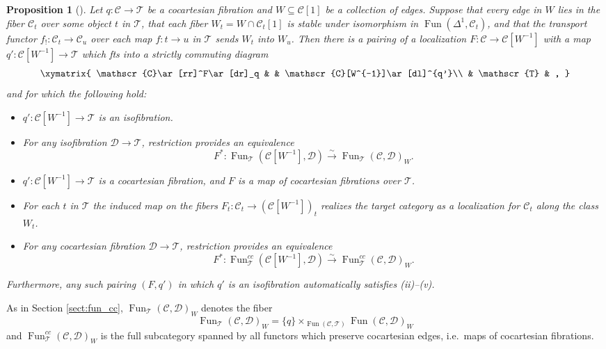 \documentclass[reqno]{amsart}
\newtheorem{proposition}[lemma]{Proposition}
\theoremstyle{definition}
\newcommand{\msc}[1]{\mathscr{#1}}
\DeclareMathOperator{\Fun}{Fun}
\renewcommand{\1}{\mathbf{1}}
\begin{document}
\begin{proposition}[{\cite[Proposition 2.1.4]{hinich16}}]\label{prop:fib_localize}
Let $q:\msc{C}\to \msc{T}$ be a cocartesian fibration and $W\subseteq \msc{C}[1]$ be a collection of edges.  Suppose that every edge in $W$ lies in the fiber $\msc{C}_t$ over some object $t$ in $\msc{T}$, that each fiber $W_t=W\cap \msc{C}_t[1]$ is stable under isomorphism in $\Fun(\Delta^1,\msc{C}_t)$, and that the transport functor $f_!:\msc{C}_t\to \msc{C}_{u}$ over each map $f:t\to u$ in $\msc{T}$ sends $W_t$ into $W_u$.  Then there is a pairing of a localization $F:\msc{C}\to \msc{C}[W^{-1}]$ with a map $q':\msc{C}[W^{-1}]\to \msc{T}$ which fts into a strictly commuting diagram
\begin{equation}\label{eq:3037}
\xymatrix{
\msc{C}\ar[rr]^F\ar[dr]_q & & \msc{C}[W^{-1}]\ar[dl]^{q'}\\
	& \msc{T} & ,
}
\end{equation}
and for which the following hold:
\begin{itemize}
\item[(i)] $q':\msc{C}[W^{-1}]\to \msc{T}$ is an isofibration.\vspace{1mm}
\item[(ii)] For any isofibration $\msc{D}\to\msc{T}$, restriction provides an equivalence
\[
F^{\ast}:\Fun_{\msc{T}}(\msc{C}[W^{-1}],\msc{D})\overset{\sim}\to \Fun_{\msc{T}}(\msc{C},\msc{D})_W.
\]
\item[(iii)] $q':\msc{C}[W^{-1}]\to \msc{T}$ is a cocartesian fibration, and $F$ is a map of cocartesian fibrations over $\msc{T}$.\vspace{1mm}
\item[(iv)] For each $t$ in $\msc{T}$ the induced map on the fibers $F_t:\msc{C}_t\to (\msc{C}[W^{-1}])_t$ realizes the target category as a localization for $\msc{C}_t$ along the class $W_t$.\vspace{1mm}
\item[(v)] For any cocartesian fibration $\msc{D}\to \msc{T}$, restriction provides an equivalence
\[
F^{\ast}:\Fun_{\msc{T}}^{cc}(\msc{C}[W^{-1}],\msc{D})\overset{\sim}\to \Fun^{cc}_{\msc{T}}(\msc{C},\msc{D})_W.
\] 
\end{itemize}
Furthermore, any such pairing $(F,q')$ in which $q'$ is an isofibration automatically satisfies (ii)--(v).
\end{proposition}

As in Section \ref{sect:fun_cc}, $\Fun_{\msc{T}}(\msc{C},\msc{D})_W$ denotes the fiber
\[
\Fun_{\msc{T}}(\msc{C},\msc{D})_W=\{q\}\times_{\Fun(\msc{C},\msc{T})}\Fun(\msc{C},\msc{D})_W
\]
and $\Fun_{\msc{T}}^{cc}(\msc{C},\msc{D})_W$ is the full subcategory spanned by all functors which preserve cocartesian edges, i.e.\ maps of cocartesian fibrations.
\end{document}
